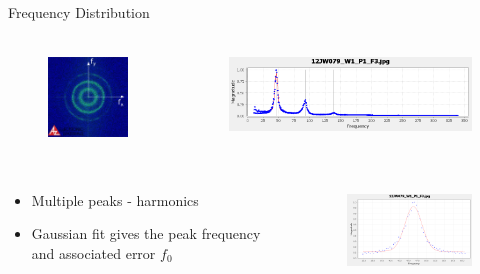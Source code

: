 \documentclass{beamer}
\begin{document}
\begin{frame}{Frequency Distribution}
	
	\begin{columns}
			\begin{figure}
				\includegraphics[height=70pt]{images/Fourier-output-axes.png}
			\end{figure}
			\begin{figure}
				\includegraphics[height=65pt]{images/image34.png}
			\end{figure}
	\end{columns}

	\begin{columns}
		\column{.5\textwidth}
		\begin{itemize}
			\item
			Multiple peaks - harmonics
			\item
			Gaussian fit gives the peak frequency and associated error
			\begin{math}
				f_{0}
			\end{math}
		\end{itemize}
		\column{.5\textwidth}
			\begin{figure}
				\includegraphics[height=80pt]{images/gaussian_fit.png}
			\end{figure}
	\end{columns}
			
\end{frame}
\end{document}
